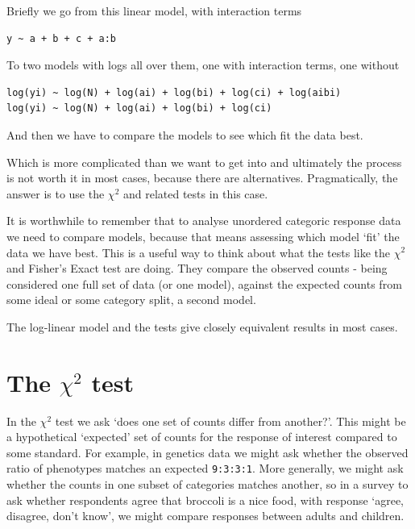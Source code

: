 \documentclass[
]{book}
\begin{document}
Briefly we go from this linear model, with interaction terms

\begin{verbatim}
y ~ a + b + c + a:b
\end{verbatim}

To two models with logs all over them, one with interaction terms, one without

\begin{verbatim}
log(yi) ~ log(N) + log(ai) + log(bi) + log(ci) + log(aibi)
log(yi) ~ log(N) + log(ai) + log(bi) + log(ci)
\end{verbatim}

And then we have to compare the models to see which fit the data best.

Which is more complicated than we want to get into and ultimately the process is not worth it in most cases, because there are alternatives. Pragmatically, the answer is to use the \(\chi^2\) and related tests in this case.

It is worthwhile to remember that to analyse unordered categoric response data we need to compare models, because that means assessing which model `fit' the data we have best. This is a useful way to think about what the tests like the \(\chi^2\) and Fisher's Exact test are doing. They compare the observed counts - being considered one full set of data (or one model), against the expected counts from some ideal or some category split, a second model.

The log-linear model and the tests give closely equivalent results in most cases.

\hypertarget{the-chi2-test}{%
\section{\texorpdfstring{The \(\chi^2\) test}{The \textbackslash chi\^{}2 test}}\label{the-chi2-test}}

In the \(\chi^2\) test we ask `does one set of counts differ from another?'. This might be a hypothetical `expected' set of counts for the response of interest compared to some standard.
For example, in genetics data we might ask whether the observed ratio of phenotypes matches an expected \texttt{9:3:3:1}. More generally, we might ask whether the counts in one subset of categories matches another, so in a survey to ask whether respondents agree that broccoli is a nice food, with response `agree, disagree, don't know', we might compare responses between adults and children.
\end{document}
